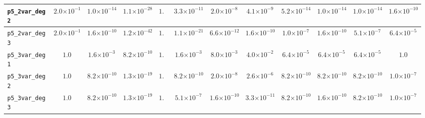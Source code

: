 \begin{landscape}
\begin{table}[H]
{\begin{tabular}{lccccccccccc}
\hline
\texttt{p5\_2var\_deg2} & $2.0{\scriptstyle\times 10^{-1}}$ & $1.0{\scriptstyle\times 10^{-14}}$ & \textbf{$1.1{\scriptstyle\times 10^{-28}}$} & $1.0$ & $3.3{\scriptstyle\times 10^{-11}}$ & $2.0{\scriptstyle\times 10^{-8}}$ & $4.1{\scriptstyle\times 10^{-9}}$ & $5.2{\scriptstyle\times 10^{-14}}$ & $1.0{\scriptstyle\times 10^{-14}}$ & $1.0{\scriptstyle\times 10^{-14}}$ & $1.6{\scriptstyle\times 10^{-10}}$ \\
\hline
\texttt{p5\_2var\_deg3} & $2.0{\scriptstyle\times 10^{-1}}$ & $1.6{\scriptstyle\times 10^{-10}}$ & \textbf{$1.2{\scriptstyle\times 10^{-42}}$} & $1.0$ & $1.1{\scriptstyle\times 10^{-21}}$ & $6.6{\scriptstyle\times 10^{-12}}$ & $1.6{\scriptstyle\times 10^{-10}}$ & $1.0{\scriptstyle\times 10^{-7}}$ & $1.6{\scriptstyle\times 10^{-10}}$ & $5.1{\scriptstyle\times 10^{-7}}$ & $6.4{\scriptstyle\times 10^{-5}}$ \\
\hline
\texttt{p5\_3var\_deg1} & $1.0$ & $1.6{\scriptstyle\times 10^{-3}}$ & \textbf{$8.2{\scriptstyle\times 10^{-10}}$} & $1.0$ & $1.6{\scriptstyle\times 10^{-3}}$ & $8.0{\scriptstyle\times 10^{-3}}$ & $4.0{\scriptstyle\times 10^{-2}}$ & $6.4{\scriptstyle\times 10^{-5}}$ & $6.4{\scriptstyle\times 10^{-5}}$ & $6.4{\scriptstyle\times 10^{-5}}$ & $1.0$ \\
\hline
\texttt{p5\_3var\_deg2} & $1.0$ & $8.2{\scriptstyle\times 10^{-10}}$ & \textbf{$1.3{\scriptstyle\times 10^{-19}}$} & $1.0$ & $8.2{\scriptstyle\times 10^{-10}}$ & $2.0{\scriptstyle\times 10^{-8}}$ & $2.6{\scriptstyle\times 10^{-6}}$ & $8.2{\scriptstyle\times 10^{-10}}$ & $8.2{\scriptstyle\times 10^{-10}}$ & $8.2{\scriptstyle\times 10^{-10}}$ & $1.0{\scriptstyle\times 10^{-7}}$ \\
\hline
\texttt{p5\_3var\_deg3} & $1.0$ & $8.2{\scriptstyle\times 10^{-10}}$ & \textbf{$1.3{\scriptstyle\times 10^{-19}}$} & $1.0$ & $5.1{\scriptstyle\times 10^{-7}}$ & $1.6{\scriptstyle\times 10^{-10}}$ & $3.3{\scriptstyle\times 10^{-11}}$ & $8.2{\scriptstyle\times 10^{-10}}$ & $1.6{\scriptstyle\times 10^{-10}}$ & $8.2{\scriptstyle\times 10^{-10}}$ & $1.0{\scriptstyle\times 10^{-7}}$ \\
\bottomrule
\end{tabular}
}%
\end{table}
\end{landscape}


